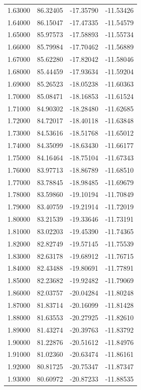 \begin{table}
\begin{tabular}{llll}
1.63000 & 86.32405 & -17.35790 & -11.53426 \\
1.64000 & 86.15047 & -17.47335 & -11.54579 \\
1.65000 & 85.97573 & -17.58893 & -11.55734 \\
1.66000 & 85.79984 & -17.70462 & -11.56889 \\
1.67000 & 85.62280 & -17.82042 & -11.58046 \\
1.68000 & 85.44459 & -17.93634 & -11.59204 \\
1.69000 & 85.26523 & -18.05238 & -11.60363 \\
1.70000 & 85.08471 & -18.16853 & -11.61524 \\
1.71000 & 84.90302 & -18.28480 & -11.62685 \\
1.72000 & 84.72017 & -18.40118 & -11.63848 \\
1.73000 & 84.53616 & -18.51768 & -11.65012 \\
1.74000 & 84.35099 & -18.63430 & -11.66177 \\
1.75000 & 84.16464 & -18.75104 & -11.67343 \\
1.76000 & 83.97713 & -18.86789 & -11.68510 \\
1.77000 & 83.78845 & -18.98485 & -11.69679 \\
1.78000 & 83.59860 & -19.10194 & -11.70849 \\
1.79000 & 83.40759 & -19.21914 & -11.72019 \\
1.80000 & 83.21539 & -19.33646 & -11.73191 \\
1.81000 & 83.02203 & -19.45390 & -11.74365 \\
1.82000 & 82.82749 & -19.57145 & -11.75539 \\
1.83000 & 82.63178 & -19.68912 & -11.76715 \\
1.84000 & 82.43488 & -19.80691 & -11.77891 \\
1.85000 & 82.23682 & -19.92482 & -11.79069 \\
1.86000 & 82.03757 & -20.04284 & -11.80248 \\
1.87000 & 81.83714 & -20.16099 & -11.81428 \\
1.88000 & 81.63553 & -20.27925 & -11.82610 \\
1.89000 & 81.43274 & -20.39763 & -11.83792 \\
1.90000 & 81.22876 & -20.51612 & -11.84976 \\
1.91000 & 81.02360 & -20.63474 & -11.86161 \\
1.92000 & 80.81725 & -20.75347 & -11.87347 \\
1.93000 & 80.60972 & -20.87233 & -11.88535 \\

\end{tabular}
\end{table}
